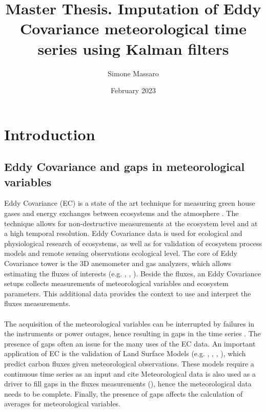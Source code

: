 \documentclass{article}
\title{Master Thesis. Imputation of Eddy Covariance meteorological time series using Kalman filters}
\author{Simone Massaro}
\date{February 2023}
\let\Oldsection\section
\renewcommand{\section}{\FloatBarrier\Oldsection}
\let\Oldsubsection\subsection
\renewcommand{\subsection}{\FloatBarrier\Oldsubsection}
\begin{document}
\maketitle
\tableofcontents
\clearpage

\section{Introduction}

\subsection{Eddy Covariance and gaps in meteorological variables}

Eddy Covariance (EC) is a state of the art technique for measuring green house gases and energy exchanges between ecosystems and the atmosphere \cite{aubinet_eddy_2012-1}.  The technique allows for non-destructive measurements at the ecosystem level and at a high temporal resolution. Eddy Covariance data is used for ecological and physiological research of ecosystems, as well as for validation of ecosystem process models and remote sensing observations \cite{papale_ideas_2020}  ecological level.
The core of Eddy Covariance tower is the 3D anemometer and gas analyzers, which allows estimating the fluxes of interests (e.g. , , ). Beside the fluxes, an Eddy Covariance setups collects measurements of meteorological variables and ecosystem parameters. This additional data provides the context to use and interpret the fluxes measurements.

\paragraph{} The acquisition of the meteorological variables can be interrupted by failures in the instruments or power outages, hence resulting in gaps in the time series \cite{aubinet_eddy_2012-1}. The presence of gaps often an issue for the many uses of the EC data. An important application of EC is the validation of Land Surface Models (e.g. \cite{balzarolo_evaluating_2014}, \cite{friend_fluxnet_2007-1}, \cite{bonan_improving_2011-1}, \cite{kramer_evaluation_2002}), which predict carbon fluxes given meteorological observations. These models require a continuous time series as an input and cite \cite{zhao_how_2012}
Meteorological data is also used as a driver to fill gaps in the fluxes measurements (\cite{aubinet_eddy_2012-1}), hence the meteorological data needs to be complete. Finally, the presence of gaps affects the calculation of averages for meteorological variables. 
\end{document}
